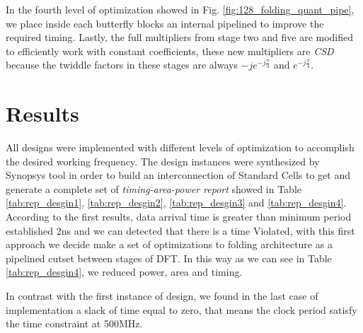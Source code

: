\documentclass[journal,comsoc]{IEEEtran}
\begin{document}
In the fourth level of optimization showed in Fig. \ref{fig:128_folding_quant_pipe}, we place inside each butterfly blocks an internal pipelined to improve the required timing. Lastly, the full multipliers from stage two and five are modified to efficiently work with constant coefficients, these new multipliers are \textit{CSD} because the twiddle factors in these stages are always $-je^{-j\frac{\pi}{4}}$ and $e^{-j\frac{\pi}{4}}$.




\section{Results}\label{sec:results}
All designs were implemented with different levels of optimization to accomplish the desired working frequency. The design instances were synthesized by Synopsys tool in order to build an interconnection of Standard Cells to get and generate a complete set of \textit{timing-area-power report} showed in Table \ref{tab:rep_desgin1}, \ref{tab:rep_desgin2}, \ref{tab:rep_desgin3} and  \ref{tab:rep_desgin4}. According to the first results, data arrival time is greater than minimum period established 2ns and we can detected that there is a time Violated, with this first approach we decide make a set of optimizations to folding architecture as a pipelined cutset between stages of DFT. In this way as we can see in Table \ref{tab:rep_desgin4}, we reduced power, area and timing. 

In contrast with the first instance of design, we found in the last case of implementation a slack of time equal to zero, that means the clock period satisfy the time constraint at 500MHz.







\end{document}
